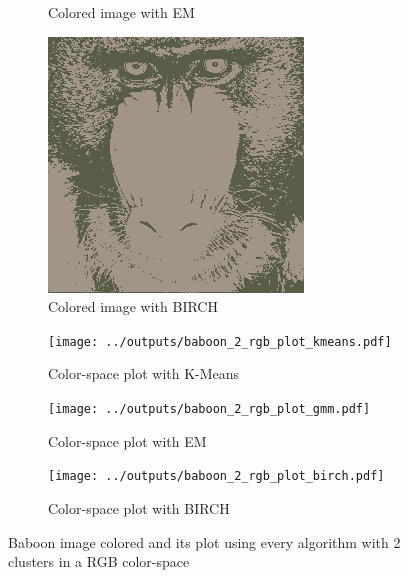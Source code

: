 \documentclass[sigconf,authorversion]{acmart}
\begin{document}
\begin{figure}[hbtp]
\begin{subfigure}[b]{0.25\textwidth}
      \caption{Colored image with EM}
      \label{subfig:baboon_rgb_gmm}
  \end{subfigure}
  \hspace{0.05\textwidth}
  \begin{subfigure}[b]{0.25\textwidth}
      \includegraphics[width=\textwidth]{../outputs/baboon_2_rgb_colored_birch.png}
      \caption{Colored image with BIRCH}
      \label{subfig:baboon_rgb_birch}
  \end{subfigure}
  \begin{subfigure}[b]{0.25\textwidth}
      \texttt{[image: ../outputs/baboon\_2\_rgb\_plot\_kmeans.pdf]}
      \caption{Color-space plot with K-Means}
      \label{subfig:p_baboon_rgb_kmeans}
  \end{subfigure}
  \hspace{0.05\textwidth}
  \begin{subfigure}[b]{0.25\textwidth}
      \texttt{[image: ../outputs/baboon\_2\_rgb\_plot\_gmm.pdf]}
      \caption{Color-space plot with EM}
      \label{subfig:p_baboon_rgb_gmm}
  \end{subfigure}
  \hspace{0.05\textwidth}
  \begin{subfigure}[b]{0.25\textwidth}
      \texttt{[image: ../outputs/baboon\_2\_rgb\_plot\_birch.pdf]}
      \caption{Color-space plot with BIRCH}
      \label{subfig:p_baboon_rgb_birch}
  \end{subfigure}
  \caption{Baboon image colored and its plot using every algorithm with 2 clusters in a RGB color-space}
  \label{fig:baboon_2_rgb}
\end{figure}

% 
% 
\end{document}
